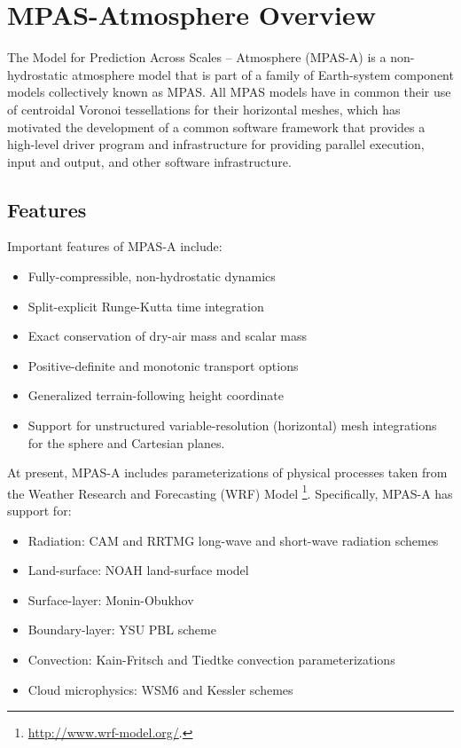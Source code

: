 
\chapter{MPAS-Atmosphere Overview}
\label{chap:atmosphere_overview}

The Model for Prediction Across Scales -- Atmosphere (MPAS-A) is a
non-hydrostatic atmosphere model that is part of a family of
Earth-system component models collectively known as MPAS.  All MPAS
models have in common their use of centroidal Voronoi tessellations for
their horizontal meshes, which has motivated the development of a common
software framework that provides a high-level driver program and
infrastructure for providing parallel execution, input and output, and
other software infrastructure.

\section{Features}

Important features of MPAS-A include:

\begin{itemize}
\item Fully-compressible, non-hydrostatic dynamics
\item Split-explicit Runge-Kutta time integration
\item Exact conservation of dry-air mass and scalar mass
\item Positive-definite and monotonic transport options
\item Generalized terrain-following height coordinate
\item Support for unstructured variable-resolution (horizontal) mesh integrations for the sphere and Cartesian planes.
\end{itemize}

At present, MPAS-A includes parameterizations of physical processes
taken from the Weather Research and Forecasting (WRF) Model
\footnote{\url{http://www.wrf-model.org/}.}. Specifically, MPAS-A has
support for:

\begin{itemize}
\item Radiation: CAM and RRTMG long-wave and short-wave radiation schemes
\item Land-surface: NOAH land-surface model
\item Surface-layer: Monin-Obukhov
\item Boundary-layer: YSU PBL scheme
\item Convection: Kain-Fritsch and Tiedtke convection parameterizations
\item Cloud microphysics: WSM6 and Kessler schemes
\end{itemize}

